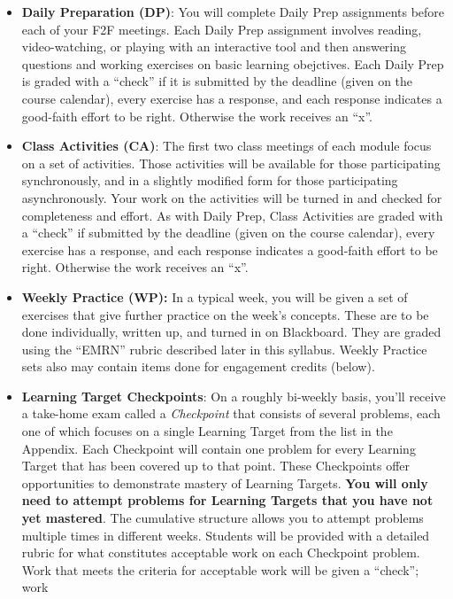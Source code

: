 \documentclass[]{article}
\providecommand{\tightlist}{%
  \setlength{\itemsep}{0pt}\setlength{\parskip}{0pt}}
\begin{document}
\begin{itemize}
\tightlist
\item
  \textbf{Daily Preparation (DP)}: You will complete Daily Prep
  assignments before each of your F2F meetings. Each Daily Prep
  assignment involves reading, video-watching, or playing with an
  interactive tool and then answering questions and working exercises on
  basic learning obejctives. Each Daily Prep is graded with a ``check''
  if it is submitted by the deadline (given on the course calendar),
  every exercise has a response, and each response indicates a
  good-faith effort to be right. Otherwise the work receives an ``x''.
\item
  \textbf{Class Activities (CA)}: The first two class meetings of each
  module focus on a set of activities. Those activities will be
  available for those participating synchronously, and in a slightly
  modified form for those participating asynchronously. Your work on the
  activities will be turned in and checked for completeness and effort.
  As with Daily Prep, Class Activities are graded with a ``check'' if
  submitted by the deadline (given on the course calendar), every
  exercise has a response, and each response indicates a good-faith
  effort to be right. Otherwise the work receives an ``x''.
\item
  \textbf{Weekly Practice (WP):} In a typical week, you will be given a
  set of exercises that give further practice on the week's concepts.
  These are to be done individually, written up, and turned in on
  Blackboard. They are graded using the ``EMRN'' rubric described later
  in this syllabus. Weekly Practice sets also may contain items done for
  engagement credits (below).
\item
  \textbf{Learning Target Checkpoints}: On a roughly bi-weekly basis,
  you'll receive a take-home exam called a \emph{Checkpoint} that
  consists of several problems, each one of which focuses on a single
  Learning Target from the list in the Appendix. Each Checkpoint will
  contain one problem for every Learning Target that has been covered up
  to that point. These Checkpoints offer opportunities to demonstrate
  mastery of Learning Targets. \textbf{You will only need to attempt
  problems for Learning Targets that you have not yet mastered}. The
  cumulative structure allows you to attempt problems multiple times in
  different weeks. Students will be provided with a detailed rubric for
  what constitutes acceptable work on each Checkpoint problem. Work that
  meets the criteria for acceptable work will be given a ``check''; work

\end{itemize}
\end{document}
